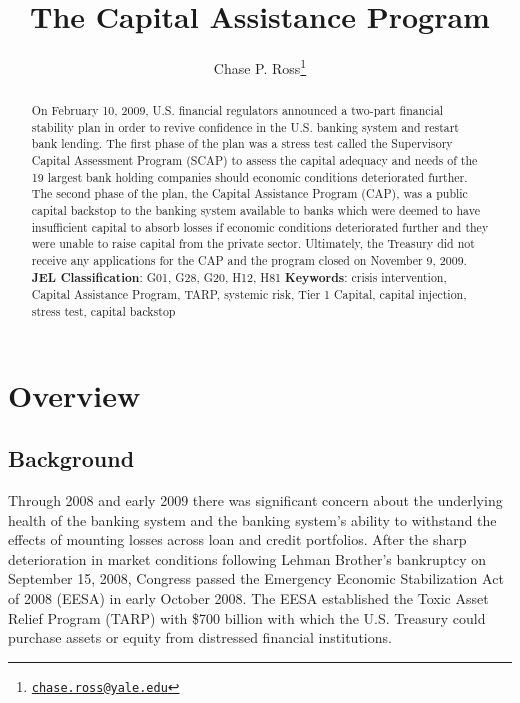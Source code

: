 \documentclass[12pt]{article}
\begin{document}
	\lhead{}
	\rhead{}
	\renewcommand{\headrulewidth}{0.0pt}
	\renewcommand{\footrulewidth}{0.0pt}

\title{The Capital Assistance Program}
\author{Chase P. Ross\thanks{\texttt{\href{mailto:chase.ross@yale.edu}{chase.ross@yale.edu}}}}
\date{}


\maketitle

\begin{abstract}
On February 10, 2009, U.S. financial regulators announced a two-part financial stability plan in order to revive confidence in the U.S. banking system and restart bank lending. The first phase of the plan was a stress test called the Supervisory Capital Assessment Program (SCAP) to assess the capital adequacy and needs of the 19 largest bank holding companies should economic conditions deteriorated further. The second phase of the plan, the Capital Assistance Program (CAP), was a public capital backstop to the banking system available to banks which were deemed to have insufficient capital to absorb losses if economic conditions deteriorated further and they were unable to raise capital from the private sector. Ultimately, the Treasury did not receive any applications for the CAP and the program closed on November 9, 2009.
\newline
\newline
\textbf{JEL Classification}: G01, G28, G20, H12, H81
\newline
\newline
\textbf{Keywords}: crisis intervention, Capital Assistance Program, TARP, systemic risk, Tier 1 Capital, capital injection, stress test, capital backstop

\end{abstract}
\newpage
\tableofcontents

\newpage
\linenumbers
\section{Overview}

\subsection{Background}

Through 2008 and early 2009 there was significant concern about the underlying health of the banking system and the banking system's ability to withstand the effects of mounting losses across loan and credit portfolios. After the sharp deterioration in market conditions following Lehman Brother's bankruptcy on September 15, 2008, Congress passed the Emergency Economic Stabilization Act of 2008 (EESA) in early October 2008. The EESA established the Toxic Asset Relief Program (TARP) with \$700 billion with which the U.S. Treasury could purchase assets or equity from distressed financial institutions.
\end{document}
